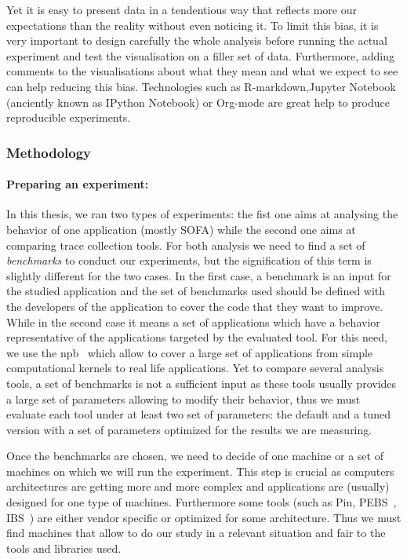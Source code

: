 Yet it is easy to present data in a tendentious way that reflects more our expectations than the reality without even noticing it.
To limit this bias, it is very important to design carefully the whole analysis before running the actual experiment and test the visualisation on a filler set of data.
Furthermore, adding comments to the visualisations about what they mean and what we expect to see can help reducing this bias.
Technologies such as \gls{R-markdown},Jupyter Notebook (anciently known as IPython Notebook) or \gls{Org-mode} are great help to produce reproducible experiments.

\subsubsection{Methodology}

\paragraph{Preparing an experiment:}

In this thesis, we ran two types of experiments: the fist one aims at analysing the behavior of one application (mostly \gls{SOFA}) while the second one aims at comparing trace collection tools.
For both analysis we need to find a set of \emph{benchmarks} to conduct our experiments, but the signification of this term is slightly different for the two cases.
In the first case, a benchmark is an input for the studied application and the set of benchmarks used should be defined with the developers of the application to cover the code that they want to improve.
While in the second case it means a set of applications which have a behavior representative of the applications targeted by the evaluated tool.
For this need, we use the \gls{npb}~\cite{Jin99NPBOpenMP} which allow to cover a large set of applications from simple computational kernels to real life applications.
Yet to compare several analysis tools, a set of benchmarks is not a sufficient input as these tools usually provides a large set of parameters allowing to modify their behavior, thus we must evaluate each tool under at least two set of parameters: the default and a tuned version with a set of parameters optimized for the results we are measuring.

Once the benchmarks are chosen, we need to decide of one machine or a set of machines on which we will run the experiment.
This step is crucial as computers architectures are getting more and more complex  and applications are (usually) designed for one type of machines.
Furthermore some tools (such as \gls{Pin}, \gls{PEBS}~\cite{Levinthal09Performance}, \gls{IBS}~\cite{Drongowski07Instructionbased}) are either vendor specific or optimized for some architecture.
Thus we must find machines that allow to do our study in a relevant situation and fair to the tools and libraries used.

